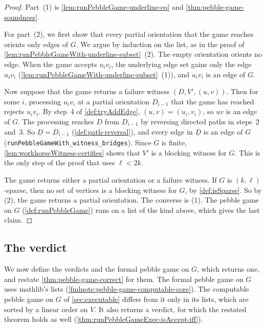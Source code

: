 \begin{proof}
  \leanok
  Part~(1) is \cref{lem:runPebbleGame-underline-eq} and
  \cref{thm:pebble-game-soundness}.

  For part~(2), we first show that every partial orientation that the
  game reaches orients only edges of $G$. We argue by induction on the
  list, as in the proof of
  \cref{lem:runPebbleGameWith-underline-subset}~(2). The empty
  orientation orients no edge. When the game accepts $u_i v_i$, the
  underlying edge set gains only the edge $u_i v_i$
  (\cref{lem:runPebbleGameWith-underline-subset}~(1)), and $u_i v_i$ is
  an edge of $G$.

  Now suppose that the game returns a failure witness
  $(D, V', (u, v))$. Then for some $i$, processing $u_i v_i$ at a
  partial orientation $D_{i-1}$ that the game has reached rejects
  $u_i v_i$. By step~4 of \cref{def:tryAddEdge}, $(u, v) = (u_i, v_i)$,
  so $uv$ is an edge of $G$. The processing reaches $D$ from $D_{i-1}$ by
  reversing directed paths in steps~2 and~3. So
  $\underline{D} = \underline{D_{i-1}}$ (\cref{def:path-reversal}), and
  every edge in $\underline{D}$ is an edge of $G$
  (\texttt{runPebbleGameWith\_\allowbreak{}witness\_\allowbreak{}bridges}).
  Since $G$ is finite,
  \cref{lem:workhorseWitness-certifies} shows that $V'$ is a blocking
  witness for $G$. This is the only step of the proof that uses
  $\ell < 2k$.

  The game returns either a partial orientation or a failure witness.
  If $G$ is $(k, \ell)$-sparse, then no set of vertices is a blocking
  witness for $G$, by \cref{def:isSparse}. So by (2), the game returns a
  partial orientation. The converse is (1). The pebble game on $G$
  (\cref{def:runPebbleGame}) runs on a list of the kind above, which
  gives the last claim.
\end{proof}

\subsection{The verdict}
\label{sec:pebble-game-verdict}

We now define the verdicts and the formal pebble game on $G$, which
returns one, and restate \cref{thm:pebble-game-correct} for them. The
formal pebble game on $G$ uses mathlib's lists
(\cref{fmlnote:pebble-game-computable-core}). The computable pebble
game on $G$ of \cref{sec:executable} differs from it only in its lists,
which are sorted by a linear order on $V$. It also returns a verdict,
for which the restated theorem holds as well
(\cref{thm:runPebbleGameExec-isAccept-iff}).

